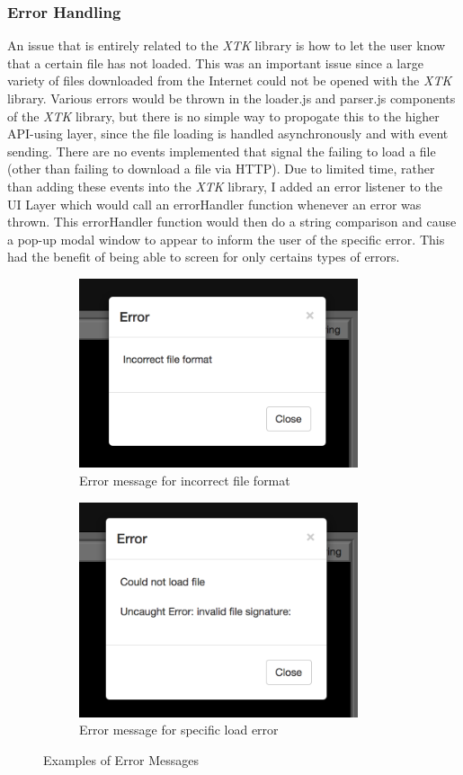 \documentclass[a4paper,11pt,twoside]{article}
\begin{document}
\subsubsection{Error Handling}
An issue that is entirely related to the \textit{XTK} library is how to let the user know that a certain file has not loaded. This was an important issue since a large variety of files downloaded from the Internet could not be opened with the \textit{XTK} library. Various errors would be thrown in the loader.js and parser.js components of the \textit{XTK} library, but there is no simple way to propogate this to the higher API-using layer, since the file loading is handled asynchronously and with event sending. There are no events implemented that signal the failing to load a file (other than failing to download a file via HTTP). Due to limited time, rather than adding these events into the \textit{XTK} library, I added an error listener to the UI Layer which would call an errorHandler function whenever an error was thrown. This errorHandler function would then do a string comparison and cause a pop-up modal window to appear to inform the user of the specific error. This had the benefit of being able to screen for only certains types of errors.


\begin{figure}
\centering
\begin{subfigure}{.5\textwidth}
  \centering
  \includegraphics[width=82mm]{graphics/error_01.png}
  \caption{Error message for incorrect file format}
\end{subfigure}%
\begin{subfigure}{.5\textwidth}
  \centering
  \includegraphics[width=82mm]{graphics/error_02.png}
  \caption{Error message for specific load error}
\end{subfigure}
\caption{Examples of Error Messages}

\end{figure}
\end{document}
